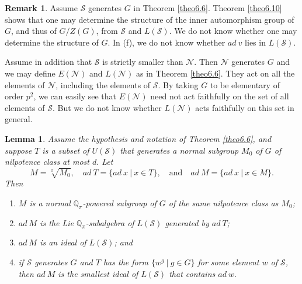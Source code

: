 \documentclass[mathscr]{amsart}
\theoremstyle{theorem}
\newtheorem{lemma}[theorem]{Lemma}
\theoremstyle{definition}
\newtheorem{remark}[theorem]{Remark}
\numberwithin{equation}{section}
\def\Q{\mathbb{Q}}
\def\S{\mathcal{S}}
\begin{document}
\begin{remark}\label{rem6.11}
Assume $\S$ generates $G$ in Theorem \ref{theo6.6}. Theorem
\ref{theo6.10} shows that one may determine the structure of the
inner automorphism group of $G$, and thus of $G/Z(G)$, from $\S$ and
$L(\S)$. We do not know whether one may determine the structure of
$G$. In (f), we do not know whether $ad\ v$ lies in $L(\S).$

Assume in addition that $\S$ is strictly smaller than $\mathcal{N}$.
Then $\mathcal{N}$ generates $G$ and we may define $E(\mathcal{N})$
and $L(\mathcal{N})$ as in Theorem \ref{theo6.6}. They act on all
the elements of $\mathcal{N}$, including the elements of $\S$. By
taking $G$ to be elementary of order $p^2$, we can easily see that
$E(\mathcal{N})$ need not act faithfully  on the set of all elements
of $\S$. But we do not know whether $L(\mathcal{N})$ acts faithfully
on this set in general.
\end{remark}

\begin{lemma}\label{lemma6.12}
Assume the hypothesis and notation of Theorem \ref{theo6.6}, and
suppose $T$ is a subset of $U(\S)$ that generates a normal subgroup
$M_0$ of $G$ of nilpotence class at most $d.$ Let
$$M=\sqrt[\pi]{M_0},\quad ad\ T=\{ad\ x\ |\ x\in T\},\quad \text{and}\quad ad\ M=\{ad\ x\ |\ x\in M\}.$$
Then
\begin{enumerate}
\item[(a)] $M$ is a normal $\Q_\pi$-powered subgroup of $G$ of the
same nilpotence class as $M_0$;
\item[(b)] $ad\ M$ is the Lie $\Q_\pi$-subalgebra of $L(\S)$
generated by $ad\ T$;
\item[(c)] $ad\ M$ is an ideal of $L(\S)$; and
\item[(d)] if $\S$ generates $G$ and $T$ has the form $\{w^g\ |\ g\in
G\}$ for some element $w$ of $\S$, then $ad\ M$ is the smallest
ideal of $L(\S)$ that contains $ad\ w.$
\end{enumerate}
\end{lemma}
\end{document}

